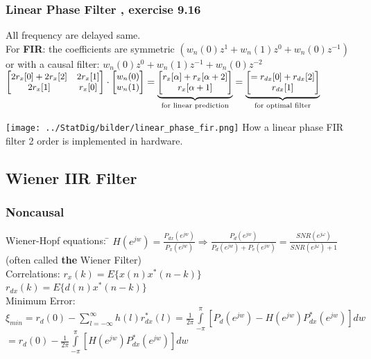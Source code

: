 \begin{minipage}{11.5cm}
\subsubsection{Linear Phase Filter , exercise 9.16} 
All frequency are delayed same. \\
For \textbf{FIR}: the coefficients are symmetric $(w_n(0)z^1+w_n(1)z^0+w_n(0)z^{-1})$ or with a causal filter: $w_n(0)z^0 + w_n(1)z^{-1} + w_n(0)z^{-2}$\\
$\small \begin{bmatrix}
2 r_x[0] + 2 r_x[2]		&	2 r_x[1] \\
2 r_x[1]				& 	r_x[0]
\end{bmatrix} \cdot \begin{bmatrix}
w_n(0)\\
w_n(1)
\end{bmatrix}= \underbrace{ \begin{bmatrix}
r_x[\alpha] + r_x[\alpha+2]\\
r_x[\alpha+1]
\end{bmatrix}}_{\text{for linear prediction} } 
= \underbrace{ \begin{bmatrix} = 
r_{dx}[0] + r_{dx}[2]\\
r_{dx}[1]
\end{bmatrix}    }_{\text{for optimal filter} }  $

\end{minipage}
\hspace{3mm}
\begin{minipage}{7cm}
\texttt{[image: ../StatDig/bilder/linear\_phase\_fir.png]}
How a linear phase FIR filter 2 order is implemented in hardware.
\end{minipage}
\subsection{Wiener IIR Filter}
\begin{minipage}{8cm}
\subsubsection{Noncausal }
\begin{tabbing}
Wiener-Hopf equations: \=
$H(e^{jw})=\frac{P_{dx}(e^{jw})}{P_{x}(e^{jw})}  \Rightarrow
\frac{P_{d}(e^{jw})}{P_{d}(e^{jw}) + P_{v}(e^{jw})}= \frac{SNR(e^{j\omega})}{SNR(e^{j\omega}) + 1}$ (often called \textbf{the} Wiener Filter) \\

Correlations: \>
	$r_x(k) =E \{ x(n)x^{*}(n-k) \} $\\ 
	\>$r_{dx}(k) =E\{d(n)x^{*}(n-k)\}$\\


Minimum Error:\>
	$\xi_{min} =r_d(0)-\sum \limits_{l=-\infty}^\infty h(l)r_{dx}^{*}(l)
	=\frac{1}{2\pi}\int \limits_{-\pi}^\pi[P_d(e^{jw})-H(e^{jw})P_{dx}^{*}(e^{jw})]dw$\\
	\>$=r_d(0)-\frac{1}{2\pi}\int \limits_{-\pi}^\pi[H(e^{jw})P_{dx}^{*}(e^{jw})]dw$
\end{tabbing}

\end{minipage}

